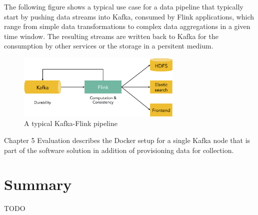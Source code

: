 The following figure shows a typical use case for a data pipeline that typically start by pushing data
streams into Kafka, consumed by Flink applications, which range from simple data transformations
to complex data aggregations in a given time window. The resulting streams are written back to Kafka
for the consumption by other services or the storage in a persitent medium.
\begin{figure}[H]
	\centering
	\includegraphics[width=0.7\textwidth]{../images/05-kafka-flink-pipeline.png}
	\caption{A typical Kafka-Flink pipeline{\cite{Dartisans15}}}
	\label{kafka-flink-pipeline}
\end{figure}

Chapter 5 Evaluation describes the Docker setup for a single Kafka node that is part of the
software solution in addition of provisioning data for collection.

\section{Summary}

TODO